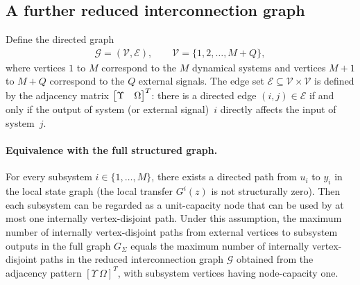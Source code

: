 \documentclass[11pt,a4paper]{article}
\begin{document}
\subsection{A further reduced interconnection graph}

Define the directed graph
\begin{align*}
    \mathcal G = (\mathcal V, \mathcal E), \qquad \mathcal V = \{1, 2, \ldots, M+Q\},
\end{align*}
where vertices $1$ to $M$ correspond to the $M$ dynamical systems and vertices $M+1$ to $M+Q$ correspond to the $Q$ external signals. 
The edge set $\mathcal E \subseteq \mathcal V\times\mathcal V$ is defined by the adjacency matrix $\begin{bmatrix} \Upsilon & \Omega \end{bmatrix}^T$: there is a directed edge $(i,j) \in \mathcal E$ if and only if the output of system (or external signal)~$i$ directly affects the input of system~$j$.


\paragraph{Equivalence with the full structured graph.}
For every subsystem $i\in\{1,\dots,M\}$, there exists a directed path from $u_i$ to $y_i$ in the local state graph (the local transfer $G^i(z)$ is not structurally zero). Then each subsystem can be regarded as a unit-capacity node that can be used by at most one internally vertex-disjoint path. Under this assumption, the maximum number of internally vertex-disjoint paths from external vertices to subsystem outputs in the full graph $G_\Sigma$ equals the maximum number of internally vertex-disjoint paths in the reduced interconnection graph $\mathcal G$ obtained from the adjacency pattern $[\Upsilon\ \Omega]^T$, with subsystem vertices having node-capacity one.


 
\end{document}
